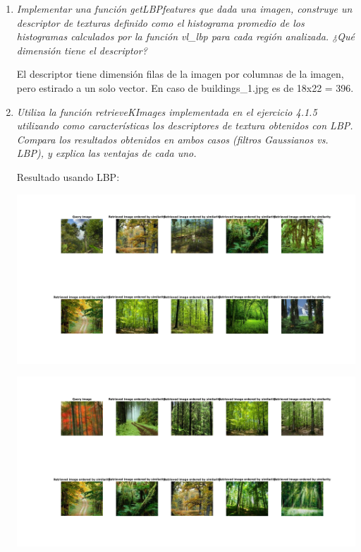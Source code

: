 \documentclass{article}
\begin{document}
\begin{enumerate}
\begin{enumerate}
 \item \textit{  Implementar una  función getLBPfeatures que dada una imagen, construye un  descriptor  de  texturas  definido  como  el  histograma  promedio  
 de  los histogramas  calculados  por  la  función  vl\_lbp para cada  región analizada.  ¿Qué dimensión tiene el descriptor?}

 El descriptor tiene dimensión filas de la imagen por columnas de la imagen, pero estirado a un solo vector. En caso de buildings\_1.jpg es de 18x22 = 396.
 
 \item \textit{Utiliza la  función  retrieveKImages implementada en el ejercicio  4.1.5  utilizando como características los descriptores de textura obtenidos con LBP. 
 Compara los resultados  obtenidos en ambos  casos  (filtros Gaussianos  vs.  LBP),  y  explica las ventajas de cada uno.}

 Resultado usando LBP:
 
 \begin{center}
	\includegraphics[width=\textwidth]{im42(1).png}
\end{center} 

 \begin{center}
	\includegraphics[width=\textwidth]{im42(2).png}
\end{center} 


\end{enumerate}
\end{enumerate}
\end{document}

